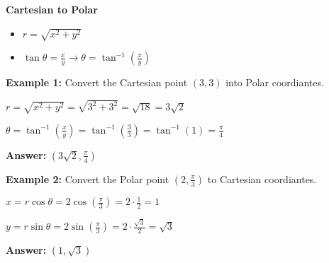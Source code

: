 \documentclass[10pt]{article}                               %
\begin{document}
\begin{defaultbox}
\begin{adjustwidth}{2em}{0pt}
\begin{adjustwidth}{2em}{0pt}
            \vspace{0.5em}

            \textbf{Cartesian to Polar}

            \begin{itemize}
                \item \( r = \sqrt{x^2 + y^2} \)
                \item \( \tan\theta = \frac{x}{y}  \rightarrow  \theta = \tan^{-1}\left(\frac{x}{y}\right) \)
            \end{itemize}

            \vspace{0.5em}


            \begin{examplebox}

                \textbf{Example 1:} Convert the Cartesian point \( \left(3,3\right) \) into Polar coordiantes.
                \vspace{0.5em}

                \begin{adjustwidth}{2em}{0pt}

                    \( r = \sqrt{x^2 + y^2} = \sqrt{3^2 + 3^2} = \sqrt{18} = 3\sqrt{2} \)

                    \( \theta = \tan^{-1}\left(\frac{x}{y}\right) = \tan^{-1}\left(\frac{3}{3}\right) = \tan^{-1}(1) = \frac{\pi}{4} \)

                    \textbf{Answer:} \( \left(3\sqrt{2}, \frac{\pi}{4}\right) \)

                \end{adjustwidth}

                \vspace{1em}

                \textbf{Example 2:} Convert the Polar point \( \left(2, \frac{\pi}{3}\right) \) to Cartesian coordiantes.
                \vspace{0.5em}

                \begin{adjustwidth}{2em}{0pt}

                    \( x = r\cos\theta = 2\cos\left(\frac{\pi}{3}\right) = 2 \cdot \frac{1}{2} = 1 \)

                    \( y = r\sin\theta = 2\sin\left(\frac{\pi}{3}\right) = 2 \cdot \frac{\sqrt{3}}{2} = \sqrt{3} \)

                    \textbf{Answer:} \( \left(1,\sqrt{3}\right) \)

                \end{adjustwidth}


\end{examplebox}
\end{adjustwidth}
\end{adjustwidth}
\end{defaultbox}
\end{document}
